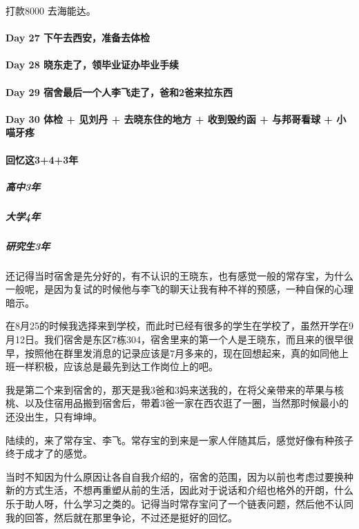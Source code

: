 \documentclass[UTF8,a4paper,8pt]{ctexart}
\begin{document}
 	 	打款8000 去海能达。
 	 	
 	 \paragraph{Day 27  下午去西安，准备去体检    \quad     }
 	 
 	 \paragraph{Day 28  晓东走了，领毕业证办毕业手续    \quad     }
 	 
 	 \paragraph{Day 29  宿舍最后一个人李飞走了，爸和2爸来拉东西    \quad     }   
 	 
 	 \paragraph{Day 30  体检 + 见刘丹 + 去晓东住的地方 + 收到毁约函 + 与邦哥看球  + 小喵牙疼 \quad     }
 	 
 	 \paragraph{回忆这3+4+3年}
 	 	\subparagraph{高中3年}
 	 	
 	 	
 	 	\subparagraph{大学4年}
 	 	
 	 	
 	 	\subparagraph{研究生3年}
 	 		还记得当时宿舍是先分好的，有不认识的王晓东，也有感觉一般的常存宝，为什么一般呢，是因为复试的时候他与李飞的聊天让我有种不祥的预感，一种自保的心理暗示。
 	 		
 	 		在8月25的时候我选择来到学校，而此时已经有很多的学生在学校了，虽然开学在9月12日。我们宿舍是东区7栋304，宿舍里来的第一个人是王晓东，而且来的很早很早，按照他在群里发消息的记录应该是7月多来的，现在回想起来，真的如同他上班一样积极，应该总是最先到达工作岗位上的吧。
 	 		
 	 		我是第二个来到宿舍的，那天是我3爸和3妈来送我的，在将父亲带来的苹果与核桃、以及住宿用品搬到宿舍后，带着3爸一家在西农逛了一圈，当然那时候最小的还没出生，只有坤坤。
 	 		
 	 		陆续的，来了常存宝、李飞。常存宝的到来是一家人伴随其后，感觉好像有种孩子终于成才了的感觉。
 	 		
 	 		当时不知因为什么原因让各自自我介绍的，宿舍的范围，因为以前也考虑过要换种新的方式生活，不想再重塑从前的生活，因此对于说话和介绍也格外的开朗，什么乐于助人呀，什么学习之类的。记得当时常存宝问了一个链表问题，然后他不认同我的回答，然后就在那里争论，不过还是挺好的回忆。
 	 		
\end{document}
